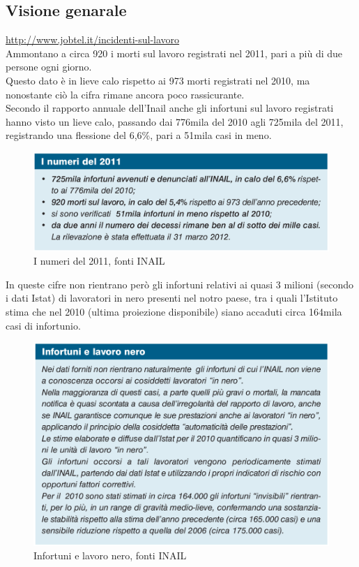 \subsection{Visione genarale}

\url{http://www.jobtel.it/incidenti-sul-lavoro}\\

Ammontano a circa 920 i morti sul lavoro registrati nel 2011, pari a più di due persone ogni giorno.\\
Questo dato è in lieve calo rispetto ai 973 morti registrati nel 2010, ma nonostante ciò la cifra rimane ancora poco rassicurante.\\
Secondo il rapporto annuale dell'Inail anche gli infortuni sul lavoro registrati hanno visto un lieve calo, passando dai 776mila del 2010 agli 725mila del 2011, registrando una flessione del 6,6\%, pari a 51mila casi in meno.\\

\begin{figure}[H]
\centering
\includegraphics[scale=0.3]{images/analisiDiMercato/infortuniGenerale}
\caption{I numeri del 2011, fonti INAIL}
\end{figure}


In queste cifre non rientrano però gli infortuni relativi ai quasi 3 milioni (secondo i dati Istat) di lavoratori in nero presenti nel notro paese, tra i quali l’Istituto stima che nel 2010 (ultima proiezione disponibile) siano accaduti circa 164mila casi di infortunio.\\

\begin{figure}[H]
\centering
\includegraphics[scale=0.4]{images/analisiDiMercato/infortuniLavoroNero}
\caption{Infortuni e lavoro nero, fonti INAIL}
\end{figure}

